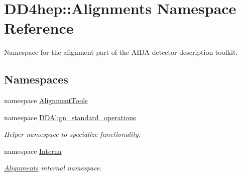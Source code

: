 \hypertarget{namespace_d_d4hep_1_1_alignments}{
\section{DD4hep::Alignments Namespace Reference}
\label{namespace_d_d4hep_1_1_alignments}
}


Namespace for the alignment part of the AIDA detector description toolkit.  
\subsection*{Namespaces}
\begin{DoxyCompactItemize}
\item 
namespace \hyperlink{namespace_d_d4hep_1_1_alignments_1_1_alignment_tools}{AlignmentTools}
\item 
namespace \hyperlink{namespace_d_d4hep_1_1_alignments_1_1_d_d_align__standard__operations}{DDAlign\_\-standard\_\-operations}


\begin{DoxyCompactList}\small\item\em Helper namespace to specialize functionality. \item\end{DoxyCompactList}\item 
namespace \hyperlink{namespace_d_d4hep_1_1_alignments_1_1_interna}{Interna}


\begin{DoxyCompactList}\small\item\em \hyperlink{namespace_d_d4hep_1_1_alignments}{Alignments} internal namespace. \item\end{DoxyCompactList}\end{DoxyCompactItemize}
